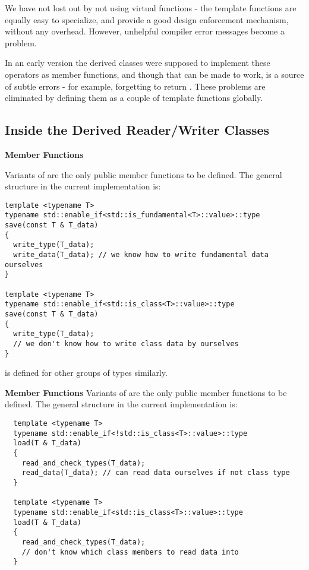 \documentclass{article}
\begin{document}
We have not lost out by not using virtual functions - the template
functions are equally easy to specialize, and provide a good design
enforcement mechanism, without any overhead. However, unhelpful
compiler error messages become a problem.

In an early version the derived classes were supposed to implement
these operators as member functions, and though that can be made to
work, is a source of subtle errors - for example, forgetting to return
. These problems are eliminated by defining them as a
couple of template functions globally.

\subsection{Inside the Derived Reader/Writer Classes}
\begin{description}
\item {}
\item \textbf{Member Functions}

  Variants of  are the only public member functions to be
  defined. The general structure in the current implementation is:

\begin{lstlisting}
template <typename T>
typename std::enable_if<std::is_fundamental<T>::value>::type
save(const T & T_data)
{
  write_type(T_data);
  write_data(T_data); // we know how to write fundamental data ourselves
}

template <typename T>
typename std::enable_if<std::is_class<T>::value>::type
save(const T & T_data)
{
  write_type(T_data);
  // we don't know how to write class data by ourselves
}
\end{lstlisting}

 is defined for other groups of types similarly.
\end{description}

\begin{description}
\item {}
\item \textbf{Member Functions}
  Variants of  are the only public member functions to be
  defined. The general structure in the current implementation is:


\begin{lstlisting}
  template <typename T>
  typename std::enable_if<!std::is_class<T>::value>::type
  load(T & T_data)
  {
    read_and_check_types(T_data);
    read_data(T_data); // can read data ourselves if not class type
  }

  template <typename T>
  typename std::enable_if<std::is_class<T>::value>::type
  load(T & T_data)
  {
    read_and_check_types(T_data);
    // don't know which class members to read data into
  }
\end{lstlisting}

\end{description}
\eoclass
\end{document}
